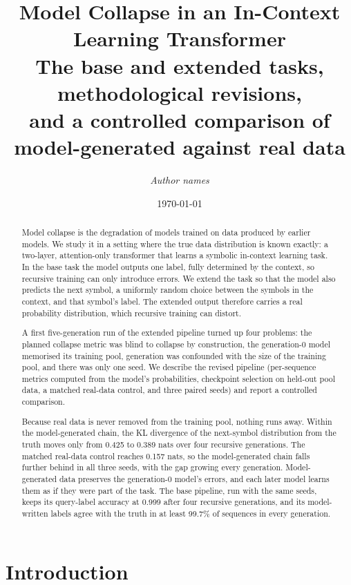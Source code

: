 \documentclass[11pt,a4paper]{article}
\title{Model Collapse in an In-Context Learning Transformer\\[4pt]
\large The base and extended tasks, methodological revisions,\\
and a controlled comparison of model-generated against real data}
\author{\emph{Author names}}%
\date{\today}
\begin{document}
\maketitle

\begin{abstract}
\noindent
Model collapse is the degradation of models trained on data produced by earlier
models. We study it in a setting where the true data distribution is known
exactly: a two-layer, attention-only transformer that learns a symbolic
in-context learning task. In the base task the model outputs one label, fully
determined by the context, so recursive training can only introduce errors. We
extend the task so that the model also predicts the next symbol, a uniformly
random choice between the symbols in the context, and that symbol's label. The
extended output therefore carries a real probability distribution, which
recursive training can distort.

A first five-generation run of the extended pipeline turned up four problems:
the planned collapse metric was blind to collapse by construction, the
generation-0 model memorised its training pool, generation was confounded with
the size of the training pool, and there was only one seed. We describe the
revised pipeline (per-sequence metrics computed from the model's
probabilities, checkpoint selection on held-out pool data, a matched real-data
control, and three paired seeds) and report a controlled comparison.

Because real data is never removed from the training pool, nothing runs away.
Within the model-generated chain, the KL divergence of the next-symbol
distribution from the truth moves only from 0.425 to 0.389 nats over four
recursive generations. The matched real-data control reaches 0.157 nats, so
the model-generated chain falls further behind in all three seeds, with the
gap growing every generation. Model-generated data preserves the
generation-0 model's errors, and each later model learns them as if they
were part of the task. The base pipeline, run with the same seeds, keeps its
query-label accuracy at 0.999 after four recursive generations, and
its model-written labels agree with the truth in at least 99.7\%
of sequences in every generation.
\end{abstract}

\tableofcontents
\clearpage

\section{Introduction}
\end{document}
